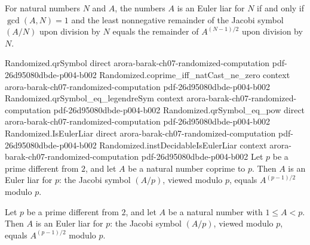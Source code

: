 \begin{theorem}
\label{Randomized.isEulerLiar_iff_emod}
\leanok
{}
For natural numbers $N$ and $A$, the numbers $A$ is an Euler liar for $N$ if and only if
$\gcd(A,N)=1$ and the least nonnegative remainder of the Jacobi symbol $(A/N)$ upon
division by $N$ equals the remainder of $A^{(N-1)/2}$ upon division by $N$.
\end{theorem}

\begin{theorem}
\label{Randomized.isEulerLiar_of_prime}
\leanok
{}
\proofstep
  {Randomized.qrSymbol}
  {direct}
  {arora-barak-ch07-randomized-computation}
  {pdf-26d95080dbde-p004-b002}
\proofstep
  {Randomized.coprime_iff_natCast_ne_zero}
  {context}
  {arora-barak-ch07-randomized-computation}
  {pdf-26d95080dbde-p004-b002}
\proofstep
  {Randomized.qrSymbol_eq_legendreSym}
  {context}
  {arora-barak-ch07-randomized-computation}
  {pdf-26d95080dbde-p004-b002}
\proofstep
  {Randomized.qrSymbol_eq_pow}
  {direct}
  {arora-barak-ch07-randomized-computation}
  {pdf-26d95080dbde-p004-b002}
\proofstep
  {Randomized.IsEulerLiar}
  {direct}
  {arora-barak-ch07-randomized-computation}
  {pdf-26d95080dbde-p004-b002}
\proofstep
  {Randomized.instDecidableIsEulerLiar}
  {context}
  {arora-barak-ch07-randomized-computation}
  {pdf-26d95080dbde-p004-b002}
Let $p$ be a prime different from $2$, and let $A$ be a natural number coprime to $p$.
Then $A$ is an Euler liar for $p$: the Jacobi symbol $(A/p)$, viewed modulo $p$, equals
$A^{(p-1)/2}$ modulo $p$.
\end{theorem}

\begin{theorem}
\label{Randomized.isEulerLiar_of_prime_of_mem_Ico}
\leanok
{}
Let $p$ be a prime different from $2$, and let $A$ be a natural number with $1\le A<p$.
Then $A$ is an Euler liar for $p$: the Jacobi symbol $(A/p)$, viewed modulo $p$, equals
$A^{(p-1)/2}$ modulo $p$.
\end{theorem}


